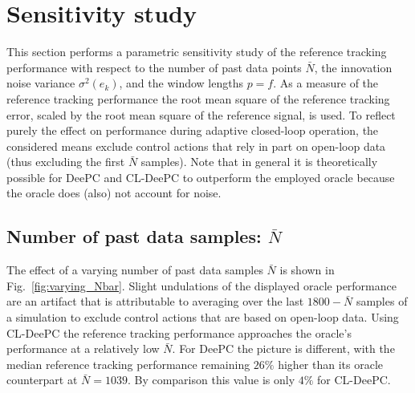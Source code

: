 \section{Sensitivity study}
This section performs a parametric sensitivity study of the reference tracking performance with respect to the number of past data points $\bar{N}$, the innovation noise variance $\sigma^2(e_k)$, and the window lengths $p=f$. As a measure of the reference tracking performance the root mean square of the reference tracking error, scaled by the root mean square of the reference signal, is used. To reflect purely the effect on performance during adaptive closed-loop operation, the considered means exclude control actions that rely in part on open-loop data (thus excluding the first $\bar{N}$ samples). Note that in general it is theoretically possible for \ac{DeePC} and \ac{CL-DeePC} to outperform the employed oracle because the oracle does (also) not account for noise.

\subsection{Number of past data samples: $\bar{N}$}
The effect of a varying number of past data samples $\bar{N}$ is shown in Fig.~\ref{fig:varying_Nbar}. Slight undulations of the displayed oracle performance are an artifact that is attributable to averaging over the last $1800-\bar{N}$ samples of a simulation to exclude control actions that are based on open-loop data. Using \ac{CL-DeePC} the reference tracking performance approaches the oracle's performance at a relatively low $\bar{N}$. For \ac{DeePC} the picture is different, with the median reference tracking performance remaining $26\%$ higher than its oracle counterpart at $\bar{N}=1039$. By comparison this value is only $4\%$ for \ac{CL-DeePC}.

